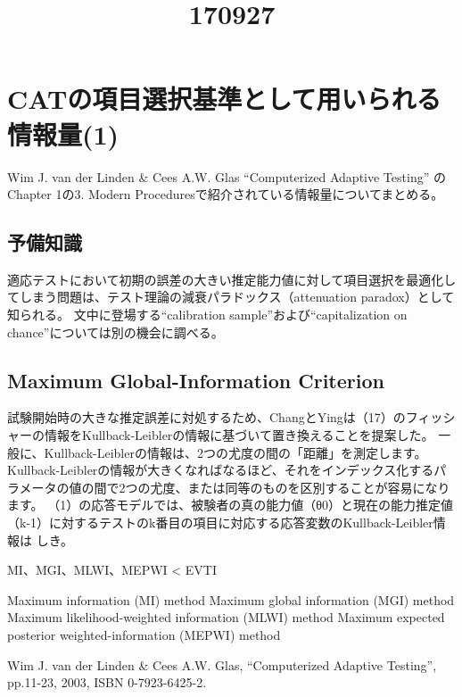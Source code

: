 \documentclass[a4j]{jarticle}
\date{}
\title{170927}
\begin{document}
\maketitle

\section{CATの項目選択基準として用いられる情報量(1)}
Wim J. van der Linden \& Cees A.W. Glas ``Computerized Adaptive Testing'' \cite{b1}のChapter 1の3. Modern Proceduresで紹介されている情報量についてまとめる。

\subsection{予備知識}
適応テストにおいて初期の誤差の大きい推定能力値に対して項目選択を最適化してしまう問題は、テスト理論の減衰パラドックス（attenuation paradox）として知られる。
文中に登場する``calibration sample''および``capitalization on chance''については別の機会に調べる。

\subsection{Maximum Global-Information Criterion}

試験開始時の大きな推定誤差に対処するため、ChangとYingは（17）のフィッシャーの情報をKullback-Leiblerの情報に基づいて置き換えることを提案した。 一般に、Kullback-Leiblerの情報は、2つの尤度の間の「距離」を測定します。 Kullback-Leiblerの情報が大きくなればなるほど、それをインデックス化するパラメータの値の間で2つの尤度、または同等のものを区別することが容易になります。
（1）の応答モデルでは、被験者の真の能力値（θ0）と現在の能力推定値（k-1）に対するテストのk番目の項目に対応する応答変数のKullback-Leibler情報は しき。

MI、MGI、MLWI、MEPWI < EVTI

Maximum information (MI) method
Maximum global information (MGI) method
Maximum likelihood-weighted information (MLWI) method
Maximum expected posterior weighted-information (MEPWI) method



\begin{thebibliography}{9}
   Wim J. van der Linden \& Cees A.W. Glas, ``Computerized Adaptive Testing'', pp.11-23, 2003, ISBN 0-7923-6425-2.
\end{thebibliography}
\end{document}
